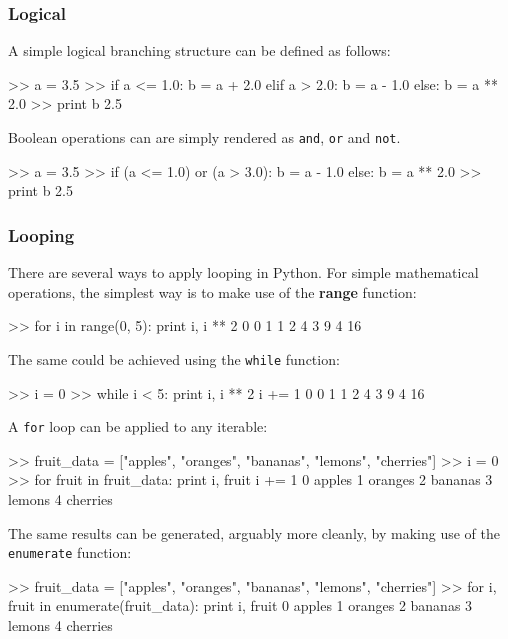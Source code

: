 \subsubsection{Logical}

A simple logical branching structure can be defined as follows:

\begin{python}[frame=single]
>> a = 3.5
>> if a <= 1.0:
       b = a + 2.0
   elif a > 2.0:
       b = a - 1.0
   else:
       b = a ** 2.0
>> print b
2.5
\end{python}

Boolean operations can are simply rendered as \verb=and=, \verb=or= and \verb=not=.
\begin{python}[frame=single]
>> a = 3.5
>> if (a <= 1.0) or (a > 3.0):
       b = a - 1.0
   else:
       b = a ** 2.0
>> print b
2.5
\end{python}

\subsubsection{Looping}

There are several ways to apply looping in Python. For simple mathematical operations, the simplest way is to make use of the \textbf{range} function:

\begin{python}[frame=single]
>> for i in range(0, 5):
       print i, i ** 2
0  0
1  1
2  4
3  9
4  16
\end{python}

The same could be achieved using the \verb=while= function:

\begin{python}[frame=single]
>> i = 0
>> while i < 5:
       print i, i ** 2
       i += 1
0  0
1  1
2  4
3  9
4  16
\end{python}

A \verb=for= loop can be applied to any iterable:

\begin{python}[frame=single]
>> fruit_data = ["apples", "oranges", "bananas", "lemons", 
                 "cherries"]
>> i = 0
>> for fruit in fruit_data:
       print i, fruit
       i += 1
0  apples
1  oranges
2  bananas
3  lemons
4  cherries
\end{python}

The same results can be generated, arguably more cleanly, by making use of the \verb=enumerate= function:

\begin{python}[frame=single]
>> fruit_data = ["apples", "oranges", "bananas", "lemons", 
                 "cherries"]
>> for i, fruit in enumerate(fruit_data):
       print i, fruit
0  apples
1  oranges
2  bananas
3  lemons
4  cherries
\end{python}

